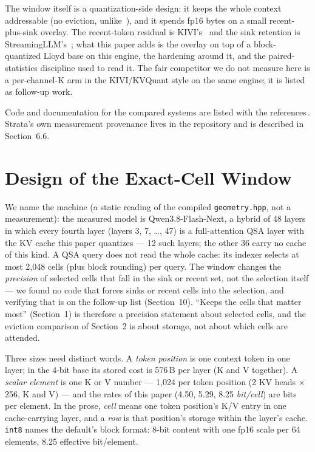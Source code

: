 \documentclass[10pt,twocolumn]{article}
\begin{document}
The window itself is a quantization-side design: it keeps the whole context addressable (no eviction, unlike~\cite{h2o,snapkv,pyramidkv}), and it spends fp16 bytes on a small recent-plus-sink overlay. The recent-token residual is KIVI's~\cite{kivi} and the sink retention is StreamingLLM's~\cite{streamingllm}; what this paper adds is the overlay on top of a block-quantized Lloyd base on this engine, the hardening around it, and the paired-statistics discipline used to read it. The fair competitor we do not measure here is a per-channel-K arm in the KIVI/KVQuant style on the same engine; it is listed as follow-up work.

Code and documentation for the compared systems are listed with the references\,\cite{streamingllm,kivi,kvquant,kvtuner,llama-cpp,vllm-fp8}. Strata's own measurement provenance lives in the repository and is described in Section~6.6.

\section{Design of the Exact-Cell Window}

We name the machine (a static reading of the compiled \texttt{geometry.hpp}, not a measurement): the measured model is Qwen3.8-Flash-Next, a hybrid of 48 layers in which every fourth layer (layers 3, 7, \ldots{}, 47) is a full-attention QSA layer with the KV cache this paper quantizes --- 12 such layers; the other 36 carry no cache of this kind. A QSA query does not read the whole cache: its indexer selects at most 2,048 cells (plus block rounding) per query. The window changes the \emph{precision} of selected cells that fall in the sink or recent set, not the selection itself --- we found no code that forces sinks or recent cells into the selection, and verifying that is on the follow-up list (Section~10). ``Keeps the cells that matter most'' (Section~1) is therefore a precision statement about selected cells, and the eviction comparison of Section~2 is about storage, not about which cells are attended.

Three sizes need distinct words. A \emph{token position} is one context token in one layer; in the 4-bit base its stored cost is 576\,B per layer (K and V together). A \emph{scalar element} is one K or V number --- 1,024 per token position (2 KV heads $\times$ 256, K and V) --- and the rates of this paper (4.50, 5.29, 8.25 \emph{bit/cell}) are bits per element. In the prose, \emph{cell} means one token position's K/V entry in one cache-carrying layer, and a \emph{row} is that position's storage within the layer's cache. \texttt{int8} names the default's block format: 8-bit content with one fp16 scale per 64 elements, 8.25 effective bit/element.
\end{document}
